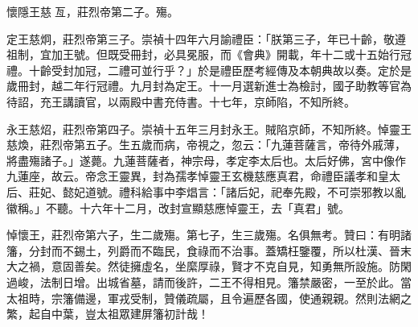 懷隱王慈亙，莊烈帝第二子。殤。

定王慈炯，莊烈帝第三子。崇禎十四年六月諭禮臣：「朕第三子，年已十齡，敬遵祖制，宜加王號。但既受冊封，必具冕服，而《會典》開載，年十二或十五始行冠禮。十齡受封加冠，二禮可並行乎？」於是禮臣歷考經傳及本朝典故以奏。定於是歲冊封，越二年行冠禮。九月封為定王。十一月選新進士為檢討，國子助教等官為待詔，充王講讀官，以兩殿中書充侍書。十七年，京師陷，不知所終。

永王慈炤，莊烈帝第四子。崇禎十五年三月封永王。賊陷京師，不知所終。悼靈王慈煥，莊烈帝第五子。生五歲而病，帝視之，忽云：「九蓮菩薩言，帝待外戚薄，將盡殤諸子。」遂薨。九蓮菩薩者，神宗母，孝定李太后也。太后好佛，宮中像作九蓮座，故云。帝念王靈異，封為孺孝悼靈王玄機慈應真君，命禮臣議孝和皇太后、莊妃、懿妃道號。禮科給事中李焻言：「諸后妃，祀奉先殿，不可崇邪教以亂徽稱。」不聽。十六年十二月，改封宣顯慈應悼靈王，去「真君」號。

悼懷王，莊烈帝第六子，生二歲殤。第七子，生三歲殤。名俱無考。贊曰：有明諸籓，分封而不錫土，列爵而不臨民，食祿而不治事。蓋矯枉鑒覆，所以杜漢、晉末大之禍，意固善矣。然徒擁虛名，坐縻厚祿，賢才不克自見，知勇無所設施。防閑過峻，法制日增。出城省墓，請而後許，二王不得相見。籓禁嚴密，一至於此。當太祖時，宗籓備邊，軍戎受制，贊儀疏屬，且令遍歷各國，使通親親。然則法網之繁，起自中葉，豈太祖眾建屏籓初計哉！

